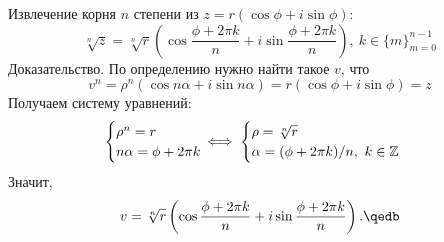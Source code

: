 Извлечение корня $n$ степени из $z=r(\cos\phi+i\sin\phi)$:
$$\sqrt[n]{z}=\sqrt[n]{r}\left(\cos\frac{\phi+2\pi k}{n}+i\sin\frac{\phi+2\pi k}{n}
\right),\ k\in\{m\}_{m=0}^{n-1}$$
{\bold Доказательство.} По определению нужно найти такое $v$, что
$$v^n=\rho^n(\cos n\alpha+i\sin n\alpha)=r(\cos\phi+i\sin\phi)=z$$
Получаем систему уравнений:
$$\begin{cases}
\rho^n=r\\
n\alpha=\phi+2\pi k
\end{cases}\hspace{-12pt}\iff\begin{cases}
\rho=\sqrt[n]{r}\\
\alpha=(\phi+2\pi k)/n,\ k\in\mathbb{Z}
\end{cases}$$
Значит,
$$v=\sqrt[n]{r}\left(\cos\frac{\phi+2\pi k}{n}+i\sin\frac{\phi+2\pi k}{n}\right).
\qedb$$
